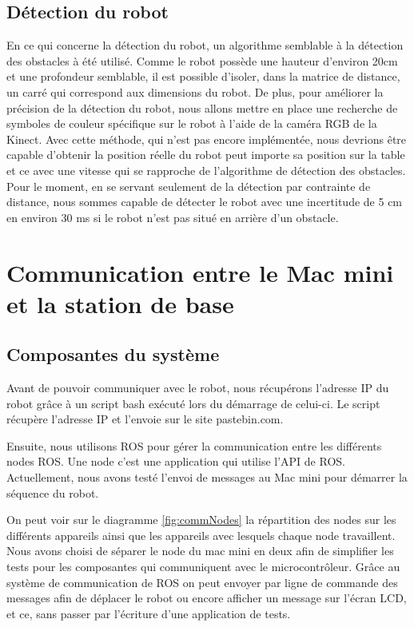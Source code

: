 \subsection{Détection du robot}
En ce qui concerne la détection du robot, un algorithme semblable à la détection des obstacles à été utilisé. Comme le robot possède une hauteur d'environ 20cm et une profondeur semblable, il est possible d'isoler, dans la matrice de distance, un carré qui correspond aux dimensions du robot. De plus, pour améliorer la précision de la détection du robot, nous allons mettre en place une recherche de symboles de couleur spécifique sur le robot à l'aide de la caméra RGB de la Kinect. Avec cette méthode, qui n'est pas encore implémentée, nous devrions être capable d'obtenir la position réelle du robot peut importe sa position sur la table et ce avec une vitesse qui se rapproche de l'algorithme de détection des obstacles. Pour le moment, en se servant seulement de la détection par contrainte de distance, nous sommes capable de détecter le robot avec une incertitude de 5 cm en environ 30 ms si le robot n'est pas situé en arrière d'un obstacle.

\section{Communication entre le Mac mini et la station de base}
\subsection{Composantes du système}
Avant de pouvoir communiquer avec le robot, nous récupérons l’adresse IP du robot grâce à un script bash exécuté lors du démarrage de celui-ci. Le script récupère l’adresse IP et l’envoie sur le site pastebin.com.

Ensuite, nous utilisons ROS pour gérer la communication entre les différents nodes ROS. Une node c’est une application qui utilise l’API de ROS. Actuellement, nous avons testé l’envoi de messages au Mac mini pour démarrer la séquence du robot.

On peut voir sur le diagramme \ref{fig:commNodes} la répartition des nodes sur les différents appareils ainsi que les appareils avec lesquels chaque node travaillent. Nous avons choisi de séparer le node du mac mini en deux afin de simplifier les tests pour les composantes qui communiquent avec le microcontrôleur. Grâce au système de communication de ROS on peut envoyer par ligne de commande des messages afin de déplacer le robot ou encore afficher un message sur l’écran LCD, et ce, sans passer par l’écriture d’une application de tests.

